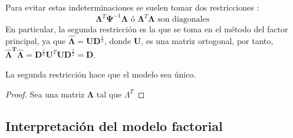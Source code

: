 \noindent Para evitar estas indeterminaciones se suelen tomar dos restricciones \cite{Mardia 1979}:
\begin{equation}
\mathbf{\Lambda}^T \mathbf{\Psi}^{-1}\mathbf{\Lambda} \text{ ó } \mathbf{\Lambda}^T \mathbf{\Lambda} \text{ son diagonales }
\end{equation}
\noindent En particular, la segunda restricción es la que se toma en el método del factor principal, ya que $\mathbf{\hat{\Lambda}}=\mathbf{UD}^{\frac{1}{2}}$, donde $\mathbf{U}$, es una matriz ortogonal, por tanto, $\mathbf{\hat{\Lambda}^T \hat{\Lambda}}=\mathbf{D}^{\frac{1}{2}}\mathbf{U}^T\mathbf{U}\mathbf{D}^{\frac{1}{2}}=\mathbf{D}$. 

\begin{propo}
La segunda restricción hace que el modelo sea único. 
\begin{proof}
Sea una matriz $\mathbf{\Lambda}$ tal que $\Lambda^T$
\end{proof}
\end{propo}
\subsection{Interpretación del modelo factorial}